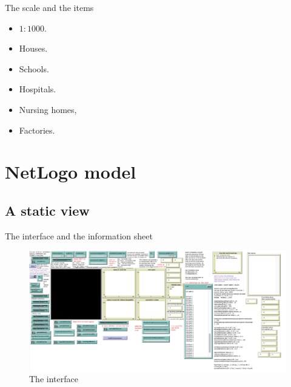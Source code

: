\documentclass[8pt]{beamer}
\begin{document}
\begin{frame}{The scale and the items}

\begin{itemize}

\item $1:1000$.

\bigskip

\item Houses.
\item Schools.
\item Hospitals.
\item Nursing homes,
\item Factories.

\end{itemize}

\end{frame}
\section{NetLogo model}

\subsection{A static view}

\begin{frame}{The interface and the information sheet}

\begin{figure}[H]
\center
\includegraphics[scale=0.28]{interface.png}

\caption{The interface} 
\label{interface}
\end{figure}

\end{frame}
\end{document}
